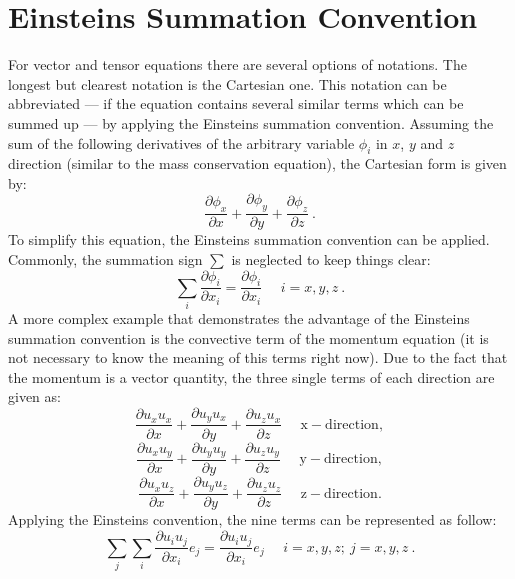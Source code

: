 \documentclass[MathematicsNumericsDerivationsAndOpenFOAM.tex]{subfiles}
\begin{document}
\section{Einsteins Summation Convention}
%
%
	For vector and tensor equations there are several options of notations. The
    longest but clearest notation is the Cartesian one. This notation can be
    abbreviated --- if the equation contains several similar terms which can be
    summed up --- by applying the Einsteins summation convention. Assuming the
    sum of the following derivatives of the arbitrary variable $\phi_i$ in
    $x$, $y$ and $z$ direction (similar to the mass conservation equation),
    the Cartesian form is given by:
%
%
\begin{equation*}
 \frac{\partial \phi_x}{\partial x}
+\frac{\partial \phi_y}{\partial y}
+\frac{\partial \phi_z}{\partial z} ~.
\end{equation*}
%
%
	To simplify this equation, the Einsteins summation convention can be
    applied. Commonly, the summation sign $\sum$ is neglected to keep things
    clear:
%
%
\begin{equation}
  \sum_{i} \frac{\partial \phi_i}{\partial x_i}
=
  \frac{\partial \phi_i}{\partial x_i} ~~~~~~ i=x,y,z ~.
\end{equation}
%
%
    A more complex example that demonstrates the advantage of the Einsteins
    summation convention is the convective term of the momentum equation (it
    is not necessary to know the meaning of this terms right now). Due to the
    fact that the momentum is a vector quantity, the three single terms of each
    direction are given as:
%
%
\begin{equation*}
 \frac{\partial u_x u_x}{\partial x}
 +
 \frac{\partial u_y u_x}{\partial y}
 +
    \frac{\partial u_z u_x}{\partial z}~~~~~~ \mathrm{x-direction},
\end{equation*}
%
%
\begin{equation*}
 \frac{\partial u_x u_y}{\partial x}
 +
 \frac{\partial u_y u_y}{\partial y}
 +
    \frac{\partial u_z u_y}{\partial z}~~~~~~ \mathrm{y-direction},
\end{equation*}
%
%
\begin{equation*}
 \frac{\partial u_x u_z}{\partial x}
 +
 \frac{\partial u_y u_z}{\partial y}
 +
    \frac{\partial u_z u_z}{\partial z}~~~~~~ \mathrm{z-direction}.
\end{equation*}
%
%
	Applying the Einsteins convention, the nine terms can be represented as
    follow:
%
%
\begin{equation}
 \sum_j \sum_i \frac{\partial u_i u_j}{\partial x_i} e_j =  \frac{\partial u_i u_j}{\partial x_i} e_j ~~~~~~i=x,y,z; ~j=x,y,z~.
\end{equation}
\end{document}
